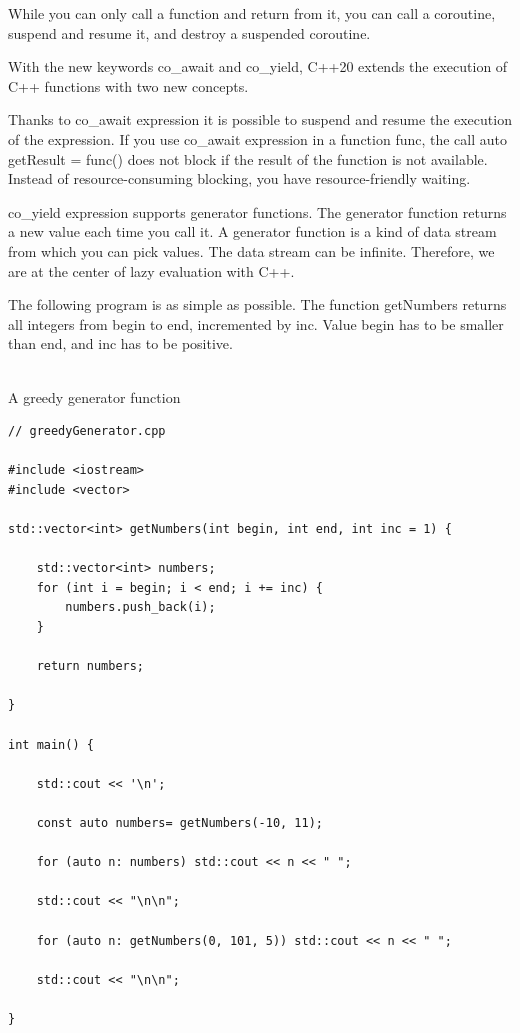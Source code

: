 While you can only call a function and return from it, you can call a coroutine, suspend and resume it, and destroy a suspended coroutine.

With the new keywords co\_await and co\_yield, C++20 extends the execution of C++ functions with two new concepts.

Thanks to co\_await expression it is possible to suspend and resume the execution of the expression. If you use co\_await expression in a function func, the call auto getResult = func() does not block if the result of the function is not available. Instead of resource-consuming blocking, you have resource-friendly waiting.

co\_yield expression supports generator functions. The generator function returns a new value each time you call it. A generator function is a kind of data stream from which you can pick values. The data stream can be infinite. Therefore, we are at the center of lazy evaluation with C++.


The following program is as simple as possible. The function getNumbers returns all integers from begin to end, incremented by inc. Value begin has to be smaller than end, and inc has to be positive.

\hspace*{\fill} \\ %
\noindent
A greedy generator function
\begin{lstlisting}[style=styleCXX]
// greedyGenerator.cpp

#include <iostream>
#include <vector>

std::vector<int> getNumbers(int begin, int end, int inc = 1) {

	std::vector<int> numbers;
	for (int i = begin; i < end; i += inc) {
		numbers.push_back(i);
	}
	
	return numbers;

}

int main() {

	std::cout << '\n';
	
	const auto numbers= getNumbers(-10, 11);
	
	for (auto n: numbers) std::cout << n << " ";
	
	std::cout << "\n\n";
	
	for (auto n: getNumbers(0, 101, 5)) std::cout << n << " ";
	
	std::cout << "\n\n";

}
\end{lstlisting}


